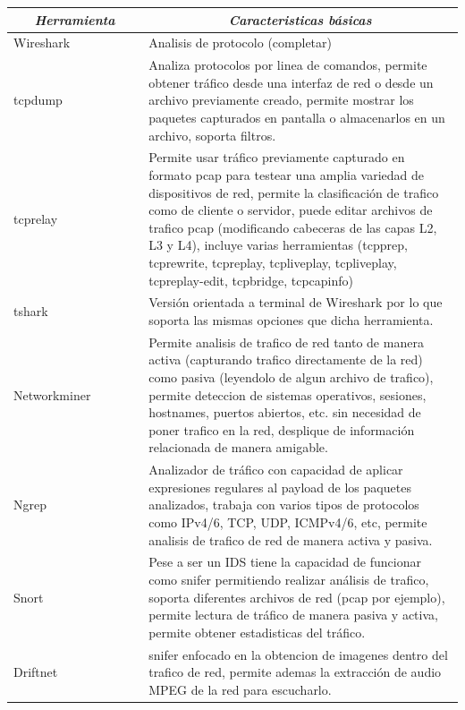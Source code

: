 \documentclass[12pt]{article}
\begin{document}
\begin{table}[htbp]
\centering
\tiny
\begin{tabular}{|p{0.3\linewidth}|p{0.7\linewidth}|}
\hline
\multicolumn{1}{|c|}{\textit{\textbf{Herramienta}}} & \multicolumn{1}{c|}{\textit{\textbf{Caracteristicas básicas}}} \tabularnewline \hline

Wireshark & 
Analisis de protocolo (completar)  
\tabularnewline \hline

tcpdump & 
Analiza protocolos por linea de comandos, permite obtener tráfico desde una interfaz de red o desde un archivo previamente creado, permite mostrar los paquetes capturados en pantalla o almacenarlos en un archivo, soporta filtros.  
\tabularnewline \hline

tcprelay & 
Permite usar tráfico previamente capturado en formato pcap para testear una amplia variedad de dispositivos de red, permite la clasificación de trafico como de cliente o servidor, puede editar archivos de trafico pcap (modificando cabeceras de las capas L2, L3 y L4), incluye varias herramientas (tcpprep, tcprewrite, tcpreplay, tcpliveplay, tcpliveplay, tcpreplay-edit, tcpbridge, tcpcapinfo)
\tabularnewline \hline

tshark & 
Versión orientada a terminal de Wireshark por lo que soporta las mismas opciones que dicha herramienta. 
\tabularnewline \hline

Networkminer & 
Permite analisis de trafico de red tanto de manera activa (capturando trafico directamente de la red) como pasiva (leyendolo de algun archivo de trafico), permite deteccion de sistemas operativos, sesiones, hostnames, puertos abiertos, etc. sin necesidad de poner trafico en la red, desplique de información relacionada de manera amigable.
\tabularnewline \hline

Ngrep & 
Analizador de tráfico con capacidad de aplicar expresiones regulares al payload de los paquetes analizados, trabaja con varios tipos de protocolos como IPv4/6, TCP, UDP, ICMPv4/6, etc, permite analisis de trafico de red de manera activa y pasiva.
\tabularnewline \hline

Snort & 
Pese a ser un IDS tiene la capacidad de funcionar como snifer permitiendo realizar análisis de trafico, soporta diferentes archivos de red (pcap por ejemplo), permite lectura de tráfico de manera pasiva y activa, permite obtener estadisticas del tráfico.
\tabularnewline \hline

Driftnet & 
snifer enfocado en la obtencion de imagenes dentro del trafico de red, permite ademas la extracción de audio MPEG de la red para escucharlo.
\tabularnewline \hline


\end{tabular}
\end{table}
\end{document}
